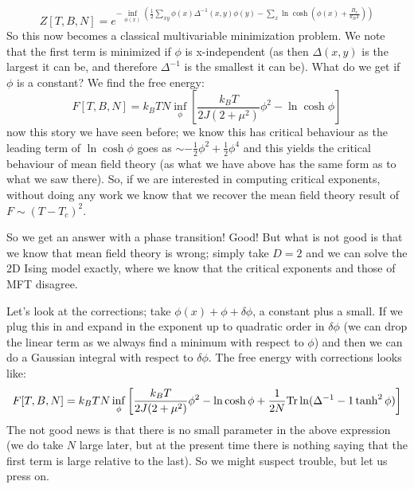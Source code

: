 \begin{equation}
    Z[T, B, N] = e^{-\inf_{\phi(x)} \left(\frac{1}{2}\sum_{xy}\phi(x)\Delta^{-1}(x, y)\phi(y) - \sum_x\ln\cosh(\phi(x) + \frac{B_x}{k_B T})\right)}
\end{equation}
So this now becomes a classical multivariable minimization problem. We note that the first term is minimized if $\phi$ is x-independent (as then $\Delta(x, y)$ is the largest it can be, and therefore $\Delta^{-1}$ is the smallest it can be). What do we get if $\phi$ is a constant? We find the free energy:
\begin{equation}
    F[T, B, N] = k_B TN\inf_\phi\left[\frac{k_B T}{2J(2+\mu^2)}\phi^2 - \ln\cosh\phi\right]
\end{equation}
now this story we have seen before; we know this has critical behaviour as the leading term of $\ln\cosh\phi$ goes as $\sim -\frac{1}{2}\phi^2 + \frac{1}{2}\phi^4$ and this yields the critical behaviour of mean field theory (as what we have above has the same form as to what we saw there). So, if we are interested in computing critical exponents, without doing any work we know that we recover the mean field theory result of $F \sim (T - T_c)^2$. 

So we get an answer with a phase transition! Good! But what is not good is that we know that mean field theory is wrong; simply take $D = 2$ and we can solve the 2D Ising model exactly, where we know that the critical exponents and those of MFT disagree. 

Let's look at the corrections; take $\phi(x) + \phi + \delta\phi$, a constant plus a small. If we plug this in and expand in the exponent up to quadratic order in $\delta \phi$ (we can drop the linear term as we always find a minimum with respect to $\phi$) and then we can do a Gaussian integral with respect to $\delta\phi$. The free energy with corrections looks like:
\begin{equation}
    F[T, B, N] = k_B TN\inf_\phi\left[\frac{k_B T}{2J(2+\mu^2)}\phi^2 - \ln\cosh\phi + \frac{1}{2N}\Tr\ln(\Delta^{-1} - 1  \tanh^2\phi)\right]
\end{equation}
The not good news is that there is no small parameter in the above expression (we do take $N$ large later, but at the present time there is nothing saying that the first term is large relative to the last). So we might suspect trouble, but let us press on.

